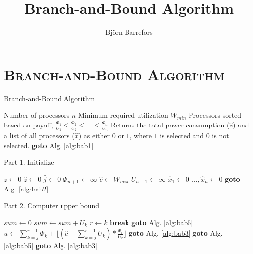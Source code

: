\documentclass{article}
\title{\textbf{\fontfamily{\sfdefault}\selectfont Branch-and-Bound Algorithm}}
\author{Bj\"{o}rn Barrefors}
\begin{document}
  \maketitle
  \section{\textsc{Branch-and-Bound Algorithm}}

    \begin{algorithm}
      \caption{Branch-and-Bound Algorithm} \label{alg:bab}
      \begin{algorithmic}[1]
        \Require
                \Statex Number of processors $n$
                \Statex Minimum required utilization $W_{min}$
                \Statex Processors sorted based on payoff, $\frac{\Phi_{1}}{U_{1}} \leq \frac{\Phi_{2}}{U_{2}} \leq \ldots \leq \frac{\Phi_{n}}{U_{n}}$
        \Ensure
                \Statex Returns the total power consumption ($\hat{z}$) and a list of all processors ($\hat{x}$) as either $0$ or $1$, where $1$ is selected and $0$ is not selected.
        \State \textbf{goto} Alg. \ref{alg:bab1}
        \EndProcedure
      \end{algorithmic}
    \end{algorithm}

    \begin{algorithm}
      \caption{Part 1. Initialize} \label{alg:bab1}
      \begin{algorithmic}[1]
        \State $z \gets 0$
        \State $\hat{z} \gets 0$
        \State $\hat{j} \gets 0$
        \State $\Phi_{n+1} \gets \infty$
        \State $\hat{c} \gets W_{min}$
        \State $U_{n+1} \gets \infty$
        \State $\hat{x}_1 \gets 0, \ldots, \hat{x}_n \gets 0$
        \State \textbf{goto} Alg. \ref{alg:bab2}
      \end{algorithmic}
    \end{algorithm}

    \begin{algorithm}
      \caption{Part 2. Computer upper bound} \label{alg:bab2}
      \begin{algorithmic}[1]
        \State $sum \gets 0$
          \State $sum \gets sum + U_{k}$
              \State $r \gets k$
              \State \textbf{break}
            \EndIf
        \EndFor
          \State \textbf{goto} Alg. \ref{alg:bab5}
        \EndIf
        \State $u \gets \sum^{r-1}_{k=j}\Phi_{k} + \lfloor (\hat{c} - \sum^{r-1}_{k=j}U_k)*\frac{\Phi_r}{U_{r}} \rfloor$
          \State \textbf{goto} Alg. \ref{alg:bab3}
        \EndIf
          \State \textbf{goto} Alg. \ref{alg:bab5}
        \EndIf
        \State \textbf{goto} Alg. \ref{alg:bab3}
      \end{algorithmic}
    \end{algorithm}
\end{document}
